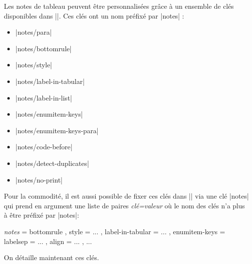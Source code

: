 \documentclass[dvipsnames]{article}
\begin{document}
Les notes de tableau peuvent être personnalisées grâce à un ensemble de clés
disponibles dans |\NiceMatrixOptions|. Ces clés ont un nom préfixé par |notes| :
\begin{itemize}[beginpenalty=10000]
\item |notes/para|
\item |notes/bottomrule|
\item |notes/style|
\item |notes/label-in-tabular|
\item |notes/label-in-list|
\item |notes/enumitem-keys|
\item |notes/enumitem-keys-para|
\item |notes/code-before|
\item |notes/detect-duplicates|
\item |notes/no-print|
\end{itemize}
Pour la commodité, il est aussi possible de fixer ces clés dans
|\NiceMatrixOptions| via une clé |notes| qui prend en argument une liste de
paires \textsl{clé=valeur} où le nom des clés n'a plus à être préfixé par
|notes|:
\begin{center}
\small
\begin{Code}[annotation=false]
\NiceMatrixOptions
  {
    \emph{notes} =
     {
       bottomrule ,
       style = ... ,
       label-in-tabular = ... ,
       enumitem-keys =
        {
          labelsep = ... ,
          align = ... ,
          ...
        }
     }
  }
\end{Code}
\end{center}


\medskip
On détaille maintenant ces clés.
\end{document}
